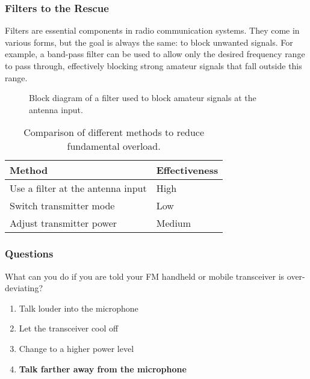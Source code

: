 \subsubsection*{Filters to the Rescue}

Filters are essential components in radio communication systems. They come in various forms, but the goal is always the same: to block unwanted signals. For example, a band-pass filter can be used to allow only the desired frequency range to pass through, effectively blocking strong amateur signals that fall outside this range. 

\begin{figure}[h]
    \centering
    \caption{Block diagram of a filter used to block amateur signals at the antenna input.}
    \label{fig:filter-block}
\end{figure}

\begin{table}[h]
    \centering
    \begin{tabular}{|l|l|}
    \hline
    \textbf{Method} & \textbf{Effectiveness} \\ \hline
    Use a filter at the antenna input & High \\ \hline
    Switch transmitter mode & Low \\ \hline
    Adjust transmitter power & Medium \\ \hline
    \end{tabular}
    \caption{Comparison of different methods to reduce fundamental overload.}
    \label{tab:overload-methods}
\end{table}

\subsubsection{Questions}

\begin{tcolorbox}[colback=gray!10!white,colframe=black!75!black,title={T7B01}]
    What can you do if you are told your FM handheld or mobile transceiver is over-deviating?
    \begin{enumerate}[label=\Alph*),noitemsep]
        \item Talk louder into the microphone
        \item Let the transceiver cool off
        \item Change to a higher power level
        \item \textbf{Talk farther away from the microphone}
    \end{enumerate}
\end{tcolorbox}

